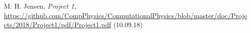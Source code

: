 \documentclass{emulateapj}
\begin{document}
%
%






\begin{acknowledgements}

\end{acknowledgements}

\begin{thebibliography}{}

  M. H. Jensen,
  \textit{Project 1},
  \url{https://github.com/CompPhysics/ComputationalPhysics/blob/master/doc/Projects/2018/Project1/pdf/Project1.pdf} (10.09.18)

\end{thebibliography}
\end{document}
